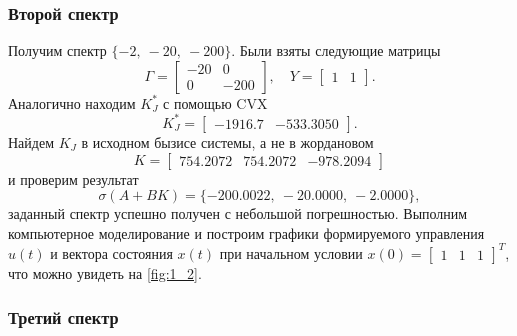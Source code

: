 \subsubsection{Второй спектр}

Получим спектр $\{-2,\ -20,\ -200\}$. Были взяты следующие матрицы
\begin{equation*}
    \Gamma=\begin{bmatrix}
        -20&  0\\
        0& -200
    \end{bmatrix},\quad
    Y=\begin{bmatrix}
        1& 1
    \end{bmatrix}.
\end{equation*}
Аналогично находим $K_J^*$ с помощью CVX
\begin{equation*}
    K_J^*=\begin{bmatrix}
        -1916.7&	-533.3050
    \end{bmatrix}.
\end{equation*}
Найдем $K_J$ в исходном бызисе
системы, а не в жордановом
\begin{equation*}
    K=\begin{bmatrix}
        754.2072&	754.2072&	-978.2094
    \end{bmatrix}
\end{equation*}
и проверим результат
\begin{equation*}
    \sigma(A+BK)=\{-200.0022,\ 
    -20.0000,\ 
    -2.0000\},
\end{equation*}
заданный спектр успешно получен с небольшой погрешностью. 
Выполним компьютерное моделирование и построим графики 
формируемого управления $u(t)$ и вектора 
состояния $x(t)$ при начальном условии 
$x(0) =\begin{bmatrix}
    1 & 1 & 1
\end{bmatrix}^T$, что можно увидеть на \autoref{fig:1_2}.


\subsubsection{Третий спектр}


